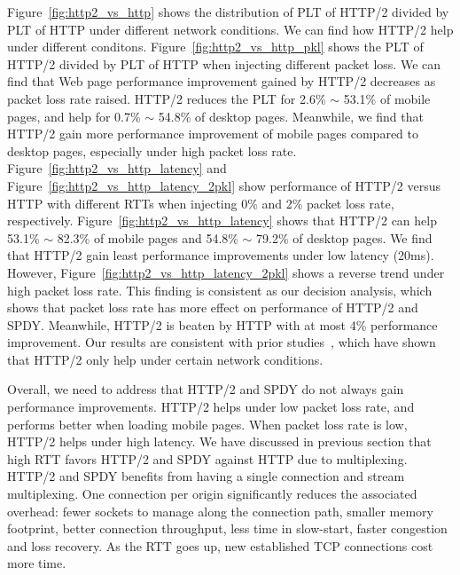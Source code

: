 Figure~\ref{fig:http2_vs_http} shows the distribution of PLT of HTTP/2 divided by PLT of HTTP under different network conditions. We can find how HTTP/2 help under different conditons. Figure~\ref{fig:http2_vs_http_pkl} shows the PLT of HTTP/2 divided by PLT of HTTP when injecting different packet loss. We can find that Web page performance improvement gained by HTTP/2 decreases as packet loss rate raised. HTTP/2 reduces the PLT for 2.6\% $\sim$ 53.1\% of mobile pages, and help for 0.7\% $\sim$ 54.8\% of desktop pages. Meanwhile, we find that HTTP/2 gain more performance improvement of mobile pages compared to desktop pages, especially under high packet loss rate. Figure~\ref{fig:http2_vs_http_latency} and Figure~\ref{fig:http2_vs_http_latency_2pkl} show performance of HTTP/2 versus HTTP with different RTTs when injecting 0\% and 2\% packet loss rate, respectively. Figure~\ref{fig:http2_vs_http_latency} shows that HTTP/2 can help 53.1\% $\sim$ 82.3\% of mobile pages and 54.8\% $\sim$ 79.2\% of desktop pages. We find that HTTP/2 gain least performance improvements under low latency (20ms). However, Figure~\ref{fig:http2_vs_http_latency_2pkl} shows a reverse trend under high packet loss rate. This finding is consistent as our decision analysis, which shows that packet loss rate has more effect on performance of HTTP/2 and SPDY. Meanwhile, HTTP/2 is beaten by HTTP with at most 4\% performance improvement. Our results are consistent with prior studies~\cite{Saxce:INFCOM15, Varvello:CORR15}, which have shown that HTTP/2 only help under certain network conditions.

Overall, we need to address that HTTP/2 and SPDY do not always gain performance improvements. HTTP/2 helps under low packet loss rate, and performs better when loading mobile pages. When packet loss rate is low, HTTP/2 helps under high latency. We have discussed in previous section that high RTT favors HTTP/2 and SPDY against HTTP due to multiplexing. HTTP/2 and SPDY benefits from having a single connection and stream multiplexing. One connection per origin significantly reduces the associated overhead: fewer sockets to manage along the connection path, smaller memory footprint, better connection throughput, less time in slow-start, faster congestion and loss recovery. As the RTT goes up, new established TCP connections cost more time.